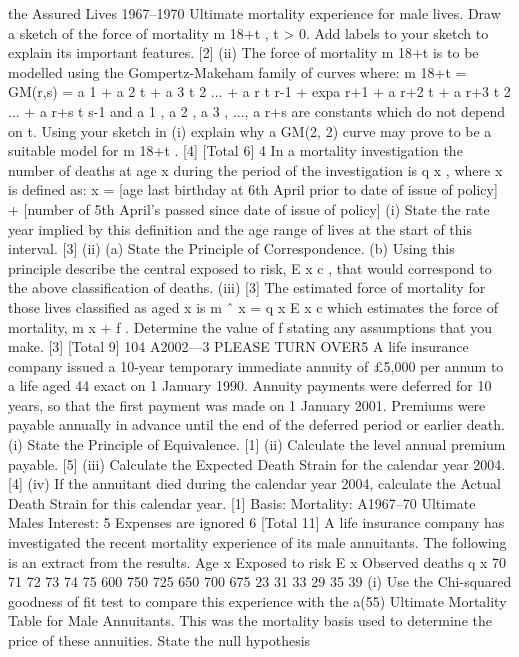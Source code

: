 the Assured Lives 1967–1970 Ultimate mortality experience for male lives.
Draw a sketch of the force of mortality m 18+t , t > 0. Add labels to your sketch
to explain its important features.
[2]
(ii)
The force of mortality m 18+t is to be modelled using the Gompertz-Makeham
family of curves where:
m 18+t = GM(r,s) = a 1 + a 2 t + a 3 t 2 ... + a r t r-1
+ exp{a r+1 + a r+2 t + a r+3 t 2 ... + a r+s t s-1 }
and a 1 , a 2 , a 3 , ..., a r+s are constants which do not depend on t.
Using your sketch in (i) explain why a GM(2, 2) curve may prove to be a
suitable model for m 18+t .
[4]
[Total 6]
4
In a mortality investigation the number of deaths at age x during the period of the
investigation is q x , where x is defined as:
x = [age last birthday at 6th April prior to date of issue of policy]
+ [number of 5th April’s passed since date of issue of policy]
(i) State the rate year implied by this definition and the age range of lives at the
start of this interval.
[3]
(ii) (a)
State the Principle of Correspondence.
(b)
Using this principle describe the central exposed to risk, E x c , that
would correspond to the above classification of deaths.
(iii)
[3]
The estimated force of mortality for those lives classified as aged x is
m ˆ x =
q x
E x c
which estimates the force of mortality, m x + f . Determine the value of f stating
any assumptions that you make.
[3]
[Total 9]
104 A2002—3
PLEASE TURN OVER5
A life insurance company issued a 10-year temporary immediate annuity of £5,000
per annum to a life aged 44 exact on 1 January 1990. Annuity payments were
deferred for 10 years, so that the first payment was made on 1 January 2001.
Premiums were payable annually in advance until the end of the deferred period or
earlier death.
(i) State the Principle of Equivalence.
[1]
(ii) Calculate the level annual premium payable.
[5]
(iii) Calculate the Expected Death Strain for the calendar year 2004.
[4]
(iv) If the annuitant died during the calendar year 2004, calculate the Actual Death
Strain for this calendar year.
[1]
Basis: Mortality: A1967–70 Ultimate Males
Interest: 5%
Expenses are ignored
6
[Total 11]
A life insurance company has investigated the recent mortality experience of its male
annuitants. The following is an extract from the results.
Age
x Exposed
to risk
E x Observed
deaths
q x
70
71
72
73
74
75 600
750
725
650
700
675 23
31
33
29
35
39
(i) Use the Chi-squared goodness of fit test to compare this experience with the
a(55) Ultimate Mortality Table for Male Annuitants. This was the mortality
basis used to determine the price of these annuities. State the null hypothesis
